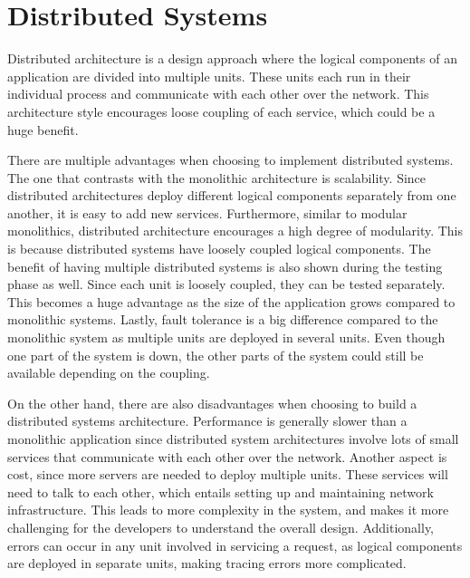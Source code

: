 \section[Distributed Systems]{Distributed Systems}\label{sec:distributed_systems}
Distributed architecture is a design approach where the logical components of an application are divided into multiple units.
These units each run in their individual process and communicate with each other over the network.
This architecture style encourages loose coupling of each service, which could be a huge benefit.

There are multiple advantages when choosing to implement distributed systems. The one that contrasts with the monolithic architecture is
scalability. Since distributed architectures deploy different logical components separately from one another, it is easy to add new services.
Furthermore, similar to modular monolithics, distributed architecture encourages a high degree of modularity.
This is because distributed systems have loosely coupled logical components.
The benefit of having multiple distributed systems is also shown during the testing phase as well. Since each unit is
loosely coupled, they can be tested separately. This becomes a huge advantage as the size of the application grows compared to
monolithic systems. Lastly, fault tolerance is a big difference compared to the monolithic system as multiple units are
deployed in several units. Even though one part of the system is down, the other parts of the system could still be available
depending on the coupling.

On the other hand, there are also disadvantages when choosing to build a distributed systems architecture.
Performance is generally slower than a monolithic application since distributed system architectures involve
lots of small services that communicate with each other over the network.
Another aspect is cost, since more servers are needed to deploy multiple units.
These services will need to talk to each other, which entails setting up and maintaining network infrastructure.
This leads to more complexity in the system, and makes it more challenging for the developers to understand the overall design.
Additionally, errors can occur in any unit involved in servicing a request, as logical components are deployed in separate units, making tracing errors more complicated.

